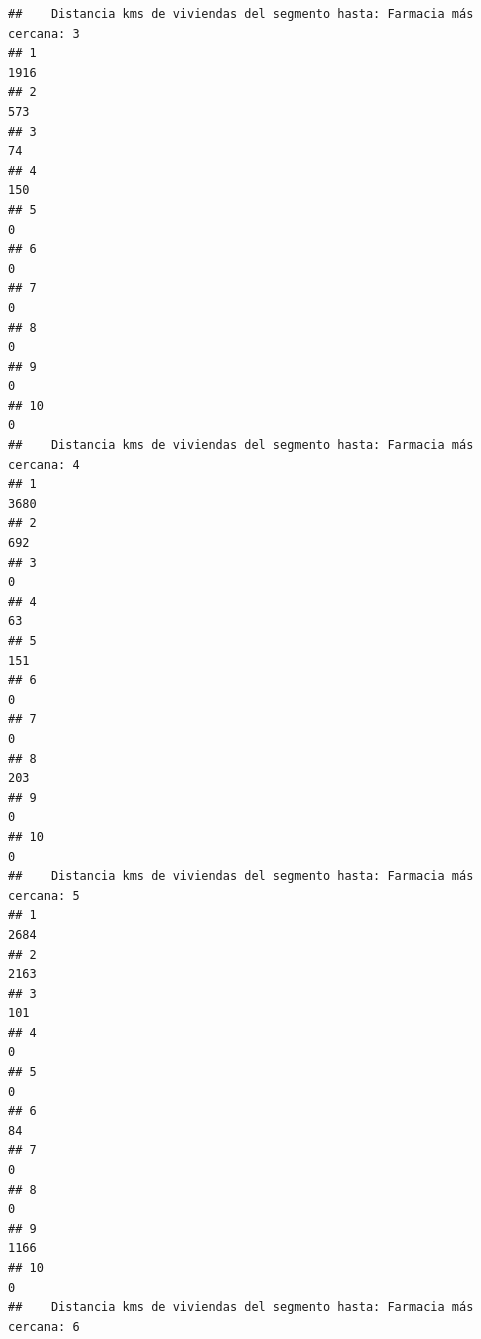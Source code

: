\documentclass[11pt,]{article}
\begin{document}
\begin{verbatim}
##    Distancia kms de viviendas del segmento hasta: Farmacia más cercana: 3
## 1                                                                    1916
## 2                                                                     573
## 3                                                                      74
## 4                                                                     150
## 5                                                                       0
## 6                                                                       0
## 7                                                                       0
## 8                                                                       0
## 9                                                                       0
## 10                                                                      0
##    Distancia kms de viviendas del segmento hasta: Farmacia más cercana: 4
## 1                                                                    3680
## 2                                                                     692
## 3                                                                       0
## 4                                                                      63
## 5                                                                     151
## 6                                                                       0
## 7                                                                       0
## 8                                                                     203
## 9                                                                       0
## 10                                                                      0
##    Distancia kms de viviendas del segmento hasta: Farmacia más cercana: 5
## 1                                                                    2684
## 2                                                                    2163
## 3                                                                     101
## 4                                                                       0
## 5                                                                       0
## 6                                                                      84
## 7                                                                       0
## 8                                                                       0
## 9                                                                    1166
## 10                                                                      0
##    Distancia kms de viviendas del segmento hasta: Farmacia más cercana: 6

\end{verbatim}
\end{document}
